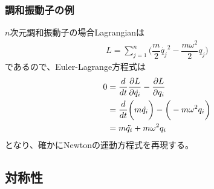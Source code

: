 \subsubsection{調和振動子の例}

$n$次元調和振動子の場合Lagrangianは
\begin{align}
  L = \sum_{j=1}^n
  \bigg(
    \dfrac{m}{2}\dot{q_j}^2
  -
    \dfrac{m\omega^2}{2} q_j
  \bigg)
\end{align}
であるので、Euler-Lagrange方程式は
\begin{align}
  0 &=
  \dfrac{d}{dt}\dfrac{\partial L}{\partial \dot{q_i} }
  - \dfrac{\partial L}{\partial q_i }
\notag\\&=
  \dfrac{d}{dt}
  \bigg(
    m\dot{q_i}
  \bigg)
  -
  \bigg(
  -
    m\omega^2 q_i
  \bigg)
\notag\\&=
    m\ddot{q_i}
  +
    m\omega^2 q_i
\end{align}
となり、確かにNewtonの運動方程式を再現する。

\subsection{対称性}

